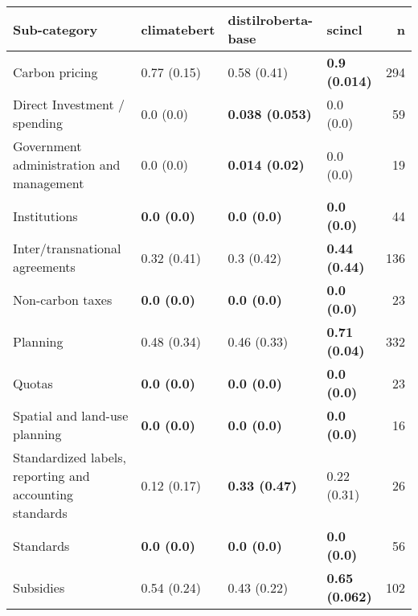 \begin{tabular}{llllr}
\toprule
Sub-category & climatebert & distilroberta-base & scincl & n \\
\midrule
Carbon pricing & 0.77 (0.15) & 0.58 (0.41) & \textbf{0.9 (0.014)} & 294 \\
Direct Investment / spending & 0.0 (0.0) & \textbf{0.038 (0.053)} & 0.0 (0.0) & 59 \\
Government administration and management & 0.0 (0.0) & \textbf{0.014 (0.02)} & 0.0 (0.0) & 19 \\
Institutions & \textbf{0.0 (0.0)} & \textbf{0.0 (0.0)} & \textbf{0.0 (0.0)} & 44 \\
Inter/transnational agreements & 0.32 (0.41) & 0.3 (0.42) & \textbf{0.44 (0.44)} & 136 \\
Non-carbon taxes & \textbf{0.0 (0.0)} & \textbf{0.0 (0.0)} & \textbf{0.0 (0.0)} & 23 \\
Planning & 0.48 (0.34) & 0.46 (0.33) & \textbf{0.71 (0.04)} & 332 \\
Quotas & \textbf{0.0 (0.0)} & \textbf{0.0 (0.0)} & \textbf{0.0 (0.0)} & 23 \\
Spatial and land-use planning & \textbf{0.0 (0.0)} & \textbf{0.0 (0.0)} & \textbf{0.0 (0.0)} & 16 \\
Standardized labels, reporting and accounting standards & 0.12 (0.17) & \textbf{0.33 (0.47)} & 0.22 (0.31) & 26 \\
Standards & \textbf{0.0 (0.0)} & \textbf{0.0 (0.0)} & \textbf{0.0 (0.0)} & 56 \\
Subsidies & 0.54 (0.24) & 0.43 (0.22) & \textbf{0.65 (0.062)} & 102 \\
\bottomrule
\end{tabular}
